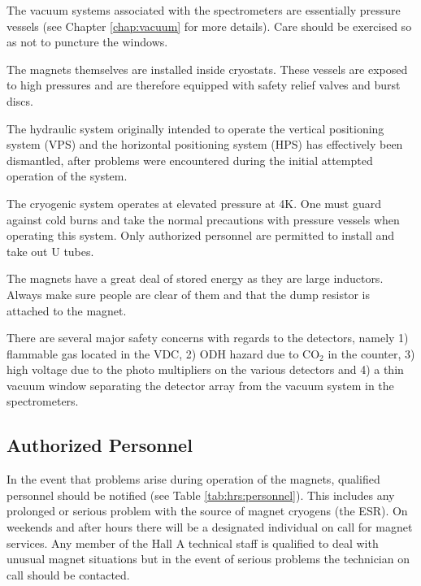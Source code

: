 The vacuum systems associated with the spectrometers are essentially 
pressure vessels (see Chapter \ref{chap:vacuum} for more details).
Care should be exercised so as not to puncture the 
windows.

The magnets themselves are installed inside cryostats.  These vessels 
are exposed to high pressures and are therefore equipped with safety 
relief valves and burst discs.

The hydraulic system originally intended to operate the vertical positioning system (VPS) 
and the horizontal positioning system (HPS) has effectively been dismantled, after problems were encountered during the initial attempted operation of the system.

The cryogenic system operates at elevated pressure at 4K.  One must 
guard against cold burns and take the normal precautions with pressure 
vessels when operating this system.  Only authorized personnel are permitted to install 
and take out U tubes.

The magnets have a great deal of stored energy as they are large 
inductors. Always make sure people are clear of them and that
the dump resistor is attached to the magnet.

There are several major safety concerns with regards to the detectors, 
namely 1) flammable gas located in the VDC, 2) ODH hazard due to 
CO$_2$ in the \Cherenkov{} counter, 3) high voltage due to the photo 
multipliers on the various detectors and 4) a thin vacuum window 
separating the detector array from the vacuum system in the 
spectrometers.


\begin{safetyen}{10}{15}
\subsection{Authorized Personnel}
\end{safetyen}

In the event that problems arise during 
operation of the magnets, qualified personnel should be notified
(see Table \ref{tab:hrs:personnel}).  
This includes any prolonged or serious problem with the source of magnet 
cryogens (the ESR).  On weekends and after hours there will be a 
designated individual on call for magnet services.  Any member of the 
Hall A technical staff is qualified to deal with unusual magnet 
situations but in the event of serious problems the technician on
call should be contacted.

